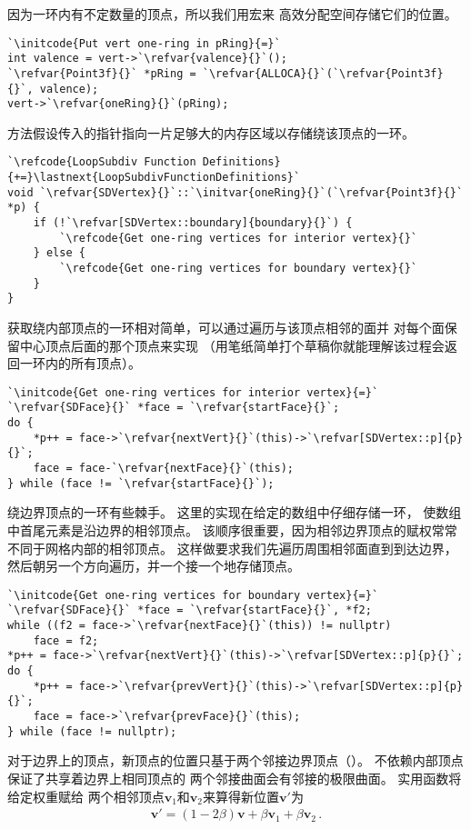因为一环内有不定数量的顶点，所以我们用宏来
高效分配空间存储它们的位置。
\begin{lstlisting}
`\initcode{Put vert one-ring in pRing}{=}`
int valence = vert->`\refvar{valence}{}`();
`\refvar{Point3f}{}` *pRing = `\refvar{ALLOCA}{}`(`\refvar{Point3f}{}`, valence);
vert->`\refvar{oneRing}{}`(pRing);
\end{lstlisting}

方法假设传入的指针指向一片足够大的内存区域以存储绕该顶点的一环。
\begin{lstlisting}
`\refcode{LoopSubdiv Function Definitions}{+=}\lastnext{LoopSubdivFunctionDefinitions}`
void `\refvar{SDVertex}{}`::`\initvar{oneRing}{}`(`\refvar{Point3f}{}` *p) {
    if (!`\refvar[SDVertex::boundary]{boundary}{}`) {
        `\refcode{Get one-ring vertices for interior vertex}{}`
    } else {
        `\refcode{Get one-ring vertices for boundary vertex}{}`
    }
}
\end{lstlisting}

获取绕内部顶点的一环相对简单，可以通过遍历与该顶点相邻的面并
对每个面保留中心顶点后面的那个顶点来实现
（用笔纸简单打个草稿你就能理解该过程会返回一环内的所有顶点）。
\begin{lstlisting}
`\initcode{Get one-ring vertices for interior vertex}{=}`
`\refvar{SDFace}{}` *face = `\refvar{startFace}{}`;
do {
    *p++ = face->`\refvar{nextVert}{}`(this)->`\refvar[SDVertex::p]{p}{}`;
    face = face-`\refvar{nextFace}{}`(this);
} while (face != `\refvar{startFace}{}`);
\end{lstlisting}

绕边界顶点的一环有些棘手。
这里的实现在给定的数组中仔细存储一环，
使数组中首尾元素是沿边界的相邻顶点。
该顺序很重要，因为相邻边界顶点的赋权常常不同于网格内部的相邻顶点。
这样做要求我们先遍历周围相邻面直到到达边界，
然后朝另一个方向遍历，并一个接一个地存储顶点。
\begin{lstlisting}
`\initcode{Get one-ring vertices for boundary vertex}{=}`
`\refvar{SDFace}{}` *face = `\refvar{startFace}{}`, *f2;
while ((f2 = face->`\refvar{nextFace}{}`(this)) != nullptr)
    face = f2;
*p++ = face->`\refvar{nextVert}{}`(this)->`\refvar[SDVertex::p]{p}{}`;
do {
    *p++ = face->`\refvar{prevVert}{}`(this)->`\refvar[SDVertex::p]{p}{}`;
    face = face->`\refvar{prevFace}{}`(this);
} while (face != nullptr);
\end{lstlisting}

对于边界上的顶点，新顶点的位置只基于两个邻接边界顶点（）。
不依赖内部顶点保证了共享着边界上相同顶点的
两个邻接曲面会有邻接的极限曲面。
实用函数将给定权重赋给
两个相邻顶点$\bm v_1$和$\bm v_2$来算得新位置$\bm v'$为
\begin{align*}
    \bm v'=(1-2\beta)\bm v+\beta\bm v_1+\beta\bm v_2\, .
\end{align*}

